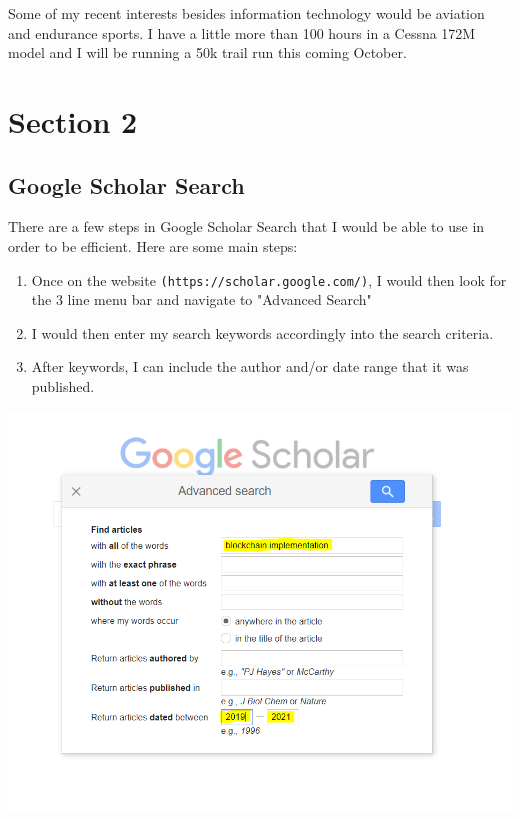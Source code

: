 \documentclass[11pt]{article}
\begin{document}
Some of my recent interests besides information technology would be aviation and endurance sports. I have a little more than 100 hours in a Cessna 172M model and I will be running a 50k trail run this coming October.

\section{Section 2}

\subsection{Google Scholar Search}
There are a few steps in Google Scholar Search that I would be able to use in order to be efficient. Here are some main steps:

\begin{enumerate}
  \item Once on the website \texttt{(https://scholar.google.com/)}, I would then look for the 3 line menu bar and navigate to "Advanced Search"
  \item I would then enter my search keywords accordingly into the search criteria. 
  \item After keywords, I can include the author and/or date range that it was published.
\end{enumerate}

\begin{center}
\includegraphics[scale=0.50]{research1.png}
\end{center}
\end{document}
